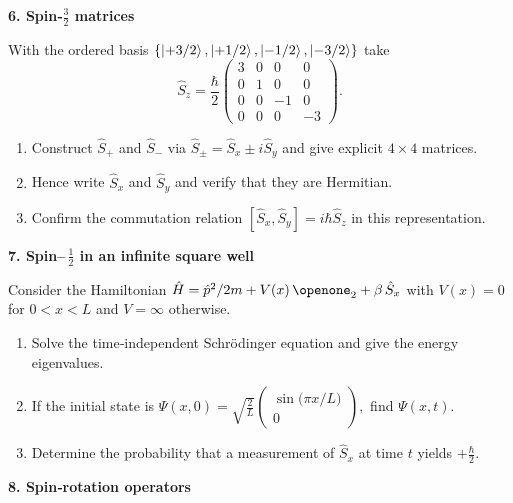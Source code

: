 \documentclass[12pt]{article}
\newcommand{\qs}{\bigskip\bigskip}
\newcommand{\vv}{\medskip}
\begin{document}
\newpage
{\large\bfseries 6.\; Spin‑$\tfrac32$ matrices}\qs

With the ordered basis
$\{\ket{+3/2},\ket{+1/2},\ket{-1/2},\ket{-3/2}\}$ take
\[
  \hat S_z = \frac{\hbar}{2}
    \begin{pmatrix} 3&0&0&0\\ 0&1&0&0\\ 0&0&-1&0\\ 0&0&0&-3 \end{pmatrix}.
\]

\begin{enumerate}[label=\textbf{\alph*)}, leftmargin=1.2cm]
  \item  Construct $\hat S_+$ and $\hat S_-$ via
        $\hat S_\pm=\hat S_x\pm i\hat S_y$ and give
        explicit $4\times4$ matrices.\vv
  \item  Hence write $\hat S_x$ and $\hat S_y$ and verify that they are
        Hermitian.\vv
  \item  Confirm the commutation relation
        $[\hat S_x,\hat S_y]=i\hbar\hat S_z$ in this representation.
\end{enumerate}

\newpage
{\large\bfseries 7.\; Spin–\,$\tfrac12$ in an infinite square well}\qs

Consider the Hamiltonian
$
 \hat H = \hat p^{2}/2m + V(x)\,\openone_2 + \beta\,\hat S_x
$
with $V(x)=0$ for $0<x<L$ and $V=\infty$ otherwise.

\begin{enumerate}[label=\textbf{\alph*)}, leftmargin=1.2cm]
  \item  Solve the time‑independent Schrödinger equation and give the
        energy eigenvalues.\vv
  \item  If the initial state is
        $
          \displaystyle
          \Psi(x,0)=\sqrt{\frac{2}{L}}
          \begin{pmatrix}
            \sin\!\bigl(\pi x/L\bigr)\\[4pt] 0
          \end{pmatrix},
          $
        find $\Psi(x,t)$.\vv
  \item  Determine the probability that a measurement of $\hat S_x$ at
        time $t$ yields $+\tfrac{\hbar}{2}$.
\end{enumerate}

\newpage
{\large\bfseries 8.\; Spin‑rotation operators}\qs
\end{document}
